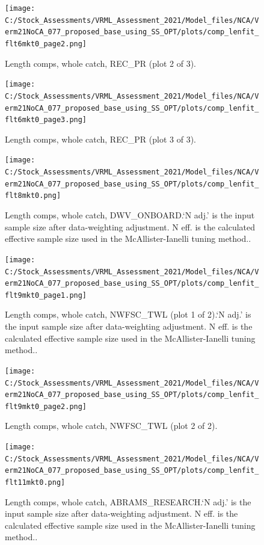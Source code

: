 \documentclass[
  english,
  a4paper,
]{article}
\begin{document}
\begin{figure}
\centering
\texttt{[image: C:/Stock\_Assessments/VRML\_Assessment\_2021/Model\_files/NCA/Verm21NoCA\_077\_proposed\_base\_using\_SS\_OPT/plots/comp\_lenfit\_flt6mkt0\_page2.png]}
\caption{Length comps, whole catch, REC\_PR (plot 2 of 3).\label{fig:comp_lenfit_flt6mkt0_page2}}
\end{figure}

\begin{figure}
\centering
\texttt{[image: C:/Stock\_Assessments/VRML\_Assessment\_2021/Model\_files/NCA/Verm21NoCA\_077\_proposed\_base\_using\_SS\_OPT/plots/comp\_lenfit\_flt6mkt0\_page3.png]}
\caption{Length comps, whole catch, REC\_PR (plot 3 of 3).\label{fig:comp_lenfit_flt6mkt0_page3}}
\end{figure}

\begin{figure}
\centering
\texttt{[image: C:/Stock\_Assessments/VRML\_Assessment\_2021/Model\_files/NCA/Verm21NoCA\_077\_proposed\_base\_using\_SS\_OPT/plots/comp\_lenfit\_flt8mkt0.png]}
\caption{Length comps, whole catch, DWV\_ONBOARD.`N adj.' is the input sample size after data-weighting adjustment. N eff. is the calculated effective sample size used in the McAllister-Ianelli tuning method..\label{fig:comp_lenfit_flt8mkt0}}
\end{figure}

\begin{figure}
\centering
\texttt{[image: C:/Stock\_Assessments/VRML\_Assessment\_2021/Model\_files/NCA/Verm21NoCA\_077\_proposed\_base\_using\_SS\_OPT/plots/comp\_lenfit\_flt9mkt0\_page1.png]}
\caption{Length comps, whole catch, NWFSC\_TWL (plot 1 of 2).`N adj.' is the input sample size after data-weighting adjustment. N eff. is the calculated effective sample size used in the McAllister-Ianelli tuning method..\label{fig:comp_lenfit_flt9mkt0_page1}}
\end{figure}

\begin{figure}
\centering
\texttt{[image: C:/Stock\_Assessments/VRML\_Assessment\_2021/Model\_files/NCA/Verm21NoCA\_077\_proposed\_base\_using\_SS\_OPT/plots/comp\_lenfit\_flt9mkt0\_page2.png]}
\caption{Length comps, whole catch, NWFSC\_TWL (plot 2 of 2).\label{fig:comp_lenfit_flt9mkt0_page2}}
\end{figure}

\begin{figure}
\centering
\texttt{[image: C:/Stock\_Assessments/VRML\_Assessment\_2021/Model\_files/NCA/Verm21NoCA\_077\_proposed\_base\_using\_SS\_OPT/plots/comp\_lenfit\_flt11mkt0.png]}
\caption{Length comps, whole catch, ABRAMS\_RESEARCH.`N adj.' is the input sample size after data-weighting adjustment. N eff. is the calculated effective sample size used in the McAllister-Ianelli tuning method..\label{fig:comp_lenfit_flt11mkt0}}
\end{figure}
\end{document}
